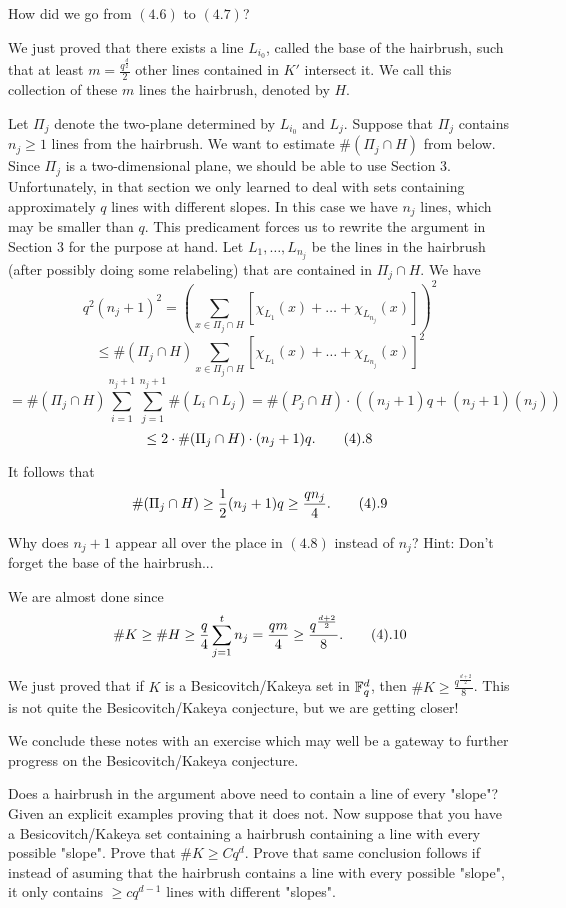  How did we go from $(4.6)$ to $(4.7)$?
\endproclaim

We just proved that there exists a line $L_{i_0}$, called the base of the
hairbrush, such that at least $m=\frac{q^{\frac{d}{2}}}{2}$ other lines
contained in $K'$ intersect it. We call this collection of these $m$ lines
the hairbrush, denoted by $H$.

Let $\Pi_j$ denote the two-plane determined by $L_{i_0}$ and $L_j$.
Suppose that $\Pi_j$ contains $n_j \ge 1$ lines from the hairbrush. We
want to estimate $\# (\Pi_j \cap H)$ from below. Since $\Pi_j$ is a
two-dimensional plane, we should be able to use Section 3. Unfortunately,
in that section we only learned to deal with sets containing
approximately $q$ lines with different slopes. In this case we have $n_j$
lines, which may be smaller than $q$. This predicament forces us to
rewrite the argument in Section 3 for the purpose at hand. Let $L_1,
\dots, L_{n_j}$ be the lines in the hairbrush (after possibly doing some
relabeling) that are contained in $\Pi_j \cap H$. We have
$$ q^2 {(n_j+1)}^2={\left( \sum_{x \in \Pi_j \cap H}
[\chi_{L_1}(x)+\dots+\chi_{L_{n_j}}(x)] \right)}^2$$ $$ \leq \# (\Pi_j
\cap H) \sum_{x \in \Pi_j \cap H}
{[\chi_{L_1}(x)+\dots+\chi_{L_{n_j}}(x)]}^2$$ $$=\# (\Pi_j \cap H)
\sum_{i=1}^{n_j+1} \sum_{j=1}^{n_j+1} \# (L_i \cap L_j)=\# (P_j \cap H)
\cdot ((n_j+1)q+(n_j+1)(n_j))$$ $$\leq 2 \cdot \# (\Pi_j \cap H) \cdot
(n_j+1)q.\tag4.8$$

It follows that
$$ \# (\Pi_j \cap H) \ge \frac{1}{2} (n_j+1)q \ge \frac{qn_j}{4}.
\tag4.9$$

 Why does $n_j+1$ appear all over the place in
$(4.8)$ instead of $n_j$? Hint: Don't forget the base of the hairbrush...
\endproclaim

We are almost done since
$$ \# K \ge \# H \ge \frac{q}{4} \sum_{j=1}^t n_j=\frac{qm}{4} \ge
\frac{q^{\frac{d+2}{2}}}{8}. \tag4.10$$

We just proved that if $K$ is a Besicovitch/Kakeya set in ${\Bbb F}_q^d$,
then $\# K \ge \frac{q^{\frac{d+2}{2}}}{8}$. This is not quite the
Besicovitch/Kakeya conjecture, but we are getting closer!

We conclude these notes with an exercise which may well be a gateway to
further progress on the Besicovitch/Kakeya conjecture.

 Does a hairbrush in the argument above need to
contain a line of every "slope"? Given an explicit examples proving that
it does not. Now suppose that you have a Besicovitch/Kakeya set containing
a hairbrush containing a line with every possible "slope". Prove that $\#
K \ge Cq^d$. Prove that same conclusion follows if instead of asuming that
the hairbrush contains a line with every possible "slope", it only
contains $\ge cq^{d-1}$ lines with different "slopes".

